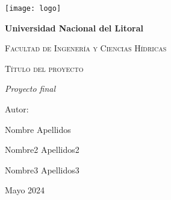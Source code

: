 \centering
{\texttt{[image: logo]}\par}
\vspace{1cm}
{\bfseries\LARGE Universidad Nacional del Litoral\par}
\vspace{1cm}
{\scshape\Large Facultad de Ingenería y Ciencias Hídricas \par}
\vspace{3cm}
{\scshape\Huge Título del proyecto \par}
\vspace{3cm}
{\itshape\Large Proyecto final \par}
\vfill
{\Large Autor: \par}
{\Large Nombre Apellidos \par}
{\Large Nombre2 Apellidos2 \par}
{\Large Nombre3 Apellidos3 \par}
\vfill
{\Large Mayo 2024 \par}
